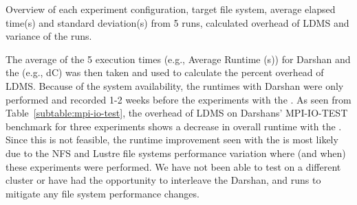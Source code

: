 \begin{table}[h]

\caption{Overview of each experiment configuration, target file system, average elapsed time(s) and standard deviation(s) from 5 runs, calculated overhead of LDMS and variance of the runs.}
\label{table:apps}
\end{table}
The average of the 5 execution times (e.g., Average Runtime (s)) for Darshan and the \connector{} (e.g., dC) was then taken and used to calculate the percent overhead of LDMS. Because of the system availability, the runtimes with Darshan were only performed and recorded 1-2 weeks before the experiments with the \connector{}. As seen from Table~\ref{subtable:mpi-io-test}, the overhead of LDMS on Darshans' MPI-IO-TEST benchmark for three experiments shows a decrease in overall runtime with the \connector{}. Since this is not feasible, the runtime improvement seen with the \connector{} is most likely due to the NFS and Lustre file systems performance variation where (and when) these experiments were performed. We have not been able to test on a different cluster or have had the opportunity to interleave the Darshan, and \connector{} runs to mitigate any file system performance changes.


